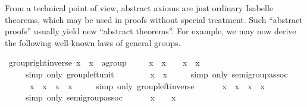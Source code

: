 \begin{isabellebody}
\begin{isamarkuptext}
 \medskip From a technical point of view, abstract axioms are just
 ordinary Isabelle theorems, which may be used in proofs without
 special treatment.  Such ``abstract proofs'' usually yield new
 ``abstract theorems''.  For example, we may now derive the following
 well-known laws of general groups.%
\end{isamarkuptext}%
\ group{\isacharunderscore}right{\isacharunderscore}inverse{\isacharcolon}\ {\isachardoublequote}x\ {\isasymodot}\ x{\isasyminv}\ {\isacharequal}\ {\isacharparenleft}{\isasymunit}{\isasymColon}{\isacharprime}a{\isasymColon}group{\isacharparenright}{\isachardoublequote}\isanewline
{}\ {\isacharminus}\isanewline
\ \ \ {\isachardoublequote}x\ {\isasymodot}\ x{\isasyminv}\ {\isacharequal}\ {\isasymunit}\ {\isasymodot}\ {\isacharparenleft}x\ {\isasymodot}\ x{\isasyminv}{\isacharparenright}{\isachardoublequote}\isanewline
\ \ \ \ \ {\isacharparenleft}simp\ only{\isacharcolon}\ group{\isachardot}left{\isacharunderscore}unit{\isacharparenright}\isanewline
\ \ \ \ {\isachardoublequote}{\isachardot}{\isachardot}{\isachardot}\ {\isacharequal}\ {\isasymunit}\ {\isasymodot}\ x\ {\isasymodot}\ x{\isasyminv}{\isachardoublequote}\isanewline
\ \ \ \ \ {\isacharparenleft}simp\ only{\isacharcolon}\ semigroup{\isachardot}assoc{\isacharparenright}\isanewline
\ \ \ \ {\isachardoublequote}{\isachardot}{\isachardot}{\isachardot}\ {\isacharequal}\ {\isacharparenleft}x{\isasyminv}{\isacharparenright}{\isasyminv}\ {\isasymodot}\ x{\isasyminv}\ {\isasymodot}\ x\ {\isasymodot}\ x{\isasyminv}{\isachardoublequote}\isanewline
\ \ \ \ \ {\isacharparenleft}simp\ only{\isacharcolon}\ group{\isachardot}left{\isacharunderscore}inverse{\isacharparenright}\isanewline
\ \ \ \ {\isachardoublequote}{\isachardot}{\isachardot}{\isachardot}\ {\isacharequal}\ {\isacharparenleft}x{\isasyminv}{\isacharparenright}{\isasyminv}\ {\isasymodot}\ {\isacharparenleft}x{\isasyminv}\ {\isasymodot}\ x{\isacharparenright}\ {\isasymodot}\ x{\isasyminv}{\isachardoublequote}\isanewline
\ \ \ \ \ {\isacharparenleft}simp\ only{\isacharcolon}\ semigroup{\isachardot}assoc{\isacharparenright}\isanewline
\ \ \ \ {\isachardoublequote}{\isachardot}{\isachardot}{\isachardot}\ {\isacharequal}\ {\isacharparenleft}x{\isasyminv}{\isacharparenright}{\isasyminv}\ {\isasymodot}\ {\isasymunit}\ {\isasymodot}\ x{\isasyminv}{\isachardoublequote}\isanewline

\end{isabellebody}
